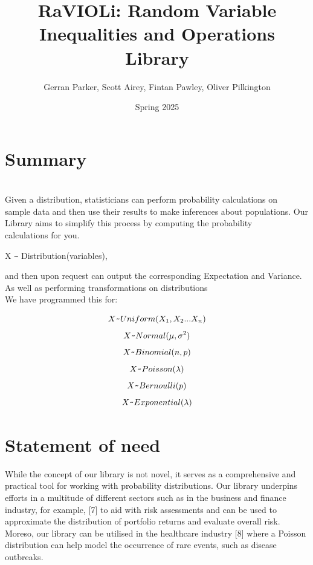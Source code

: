 \documentclass{article}
\title{RaVIOLi: Random Variable Inequalities and Operations Library}
\author{Gerran Parker, Scott Airey, Fintan Pawley, Oliver Pilkington}
\date{Spring 2025}
\begin{document}
\maketitle

\section{Summary}

 \\ {Given a distribution, statisticians can perform probability calculations on} \\ {sample data and then use their results to make inferences about populations. Our Library aims to simplify this process by computing the probability} \\ {calculations for you.} \\ 
 \begin{center}
    {X \verb|~|  Distribution(variables),}
\end{center} {and then upon request can output the corresponding Expectation and Variance. As well as performing transformations on distributions} \\ {We have programmed this for:}
\begin{center}
    $$X \verb|~| Uniform(X_1,X_2...X_n)$$  
    $$X \verb|~| Normal(\mu,\sigma^2)$$  
    $$X \verb|~| Binomial(n,p)$$    
    $$X \verb|~| Poisson(\lambda)$$  
    $$X \verb|~| Bernoulli(p)$$
    $$X \verb|~|Exponential(\lambda)$$

\end{center}

\section {Statement of need}
While the concept of our library is not novel, it serves as a comprehensive and practical tool for working with probability distributions. Our library underpins efforts in a multitude of different sectors such as in the business and finance industry, for example, [7] to aid with risk assessments and can be used to approximate the distribution of portfolio returns and evaluate overall risk. Moreso, our library can be utilised in the healthcare industry [8] where a Poisson distribution can help model the occurrence of rare events, such as disease outbreaks.
\end{document}
